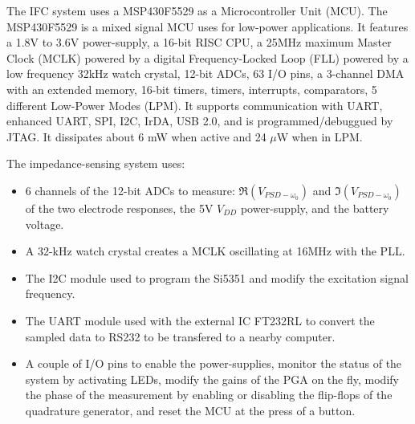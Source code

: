 The IFC system uses a MSP430F5529 as a Microcontroller Unit (MCU). The MSP430F5529 is a mixed signal MCU uses for low-power applications. It features a 1.8V to 3.6V power-supply, a 16-bit RISC CPU, a 25MHz maximum Master Clock (MCLK) powered by a digital Frequency-Locked Loop (FLL) powered by a low frequency 32kHz watch crystal, 12-bit ADCs, 63 I/O pins, a 3-channel DMA with an extended memory, 16-bit timers, timers, interrupts, comparators, 5 different Low-Power Modes (LPM). It supports communication with UART, enhanced UART, SPI, I2C, IrDA, USB 2.0, and is programmed/debuggued by JTAG. It dissipates about 6 mW when active and 24 $\mu$W when in LPM. \par

The impedance-sensing system uses:
\begin{itemize}
	\item 6 channels of the 12-bit ADCs to measure: $\Re(V_{PSD-\omega_0})$ and $\Im(V_{PSD-\omega_0})$ of the two electrode responses, the 5V $V_{DD}$ power-supply, and the battery voltage. 
	\item A 32-kHz watch crystal creates a MCLK oscillating at 16MHz with the PLL. 
	\item The I2C module used to program the Si5351 and modify the excitation signal frequency. 
	\item The UART module used with the external IC FT232RL to convert the sampled data to RS232 to be transfered to a nearby computer.
	\item A couple of I/O pins to enable the power-supplies, monitor the status of the system by activating LEDs, modify the gains of the PGA on the fly, modify the phase of the measurement by enabling or disabling the flip-flops of the quadrature generator, and reset the MCU at the press of a button. 
\end{itemize}